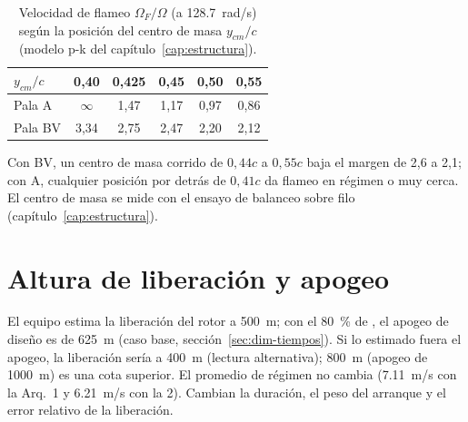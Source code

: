 \begin{table}[H]
\centering\small
\caption{Velocidad de flameo $\Omega_F/\Omega$ (a \SI{128.7}{rad/s}) según la posición del
centro de masa $y_{cm}/c$ (modelo p-k del capítulo~\ref{cap:estructura}).}\label{tab:sens-flameo}
\begin{tabular}{@{}lccccc@{}}
\toprule
$y_{cm}/c$ & 0,40 & 0,425 & 0,45 & 0,50 & 0,55\\\midrule
Pala A & $\infty$ & 1,47 & 1,17 & 0,97 & 0,86\\
Pala BV & 3,34 & 2,75 & 2,47 & 2,20 & 2,12\\
\bottomrule
\end{tabular}
\end{table}

Con BV, un centro de masa corrido de $0{,}44c$ a $0{,}55c$ baja el margen de 2,6 a 2,1; con A,
cualquier posición por detrás de $0{,}41c$ da flameo en régimen o muy cerca. El centro de masa
se mide con el ensayo de balanceo sobre filo (capítulo~\ref{cap:estructura}).

\section{Altura de liberación y apogeo}\label{sec:sens-altura}

El equipo estima la liberación del rotor a \SI{500}{m}; con el \SI{80}{\percent} de , el
apogeo de diseño es de \SI{625}{m} (caso base, sección~\ref{sec:dim-tiempos}). Si lo estimado
fuera el apogeo, la liberación sería a \SI{400}{m} (lectura alternativa); \SI{800}{m} (apogeo de
\SI{1000}{m}) es una cota superior. El promedio de régimen no cambia (\SI{7.11}{m/s} con la
Arq.~1 y \SI{6.21}{m/s} con la 2). Cambian la duración, el peso del arranque y el error relativo
de la liberación.

